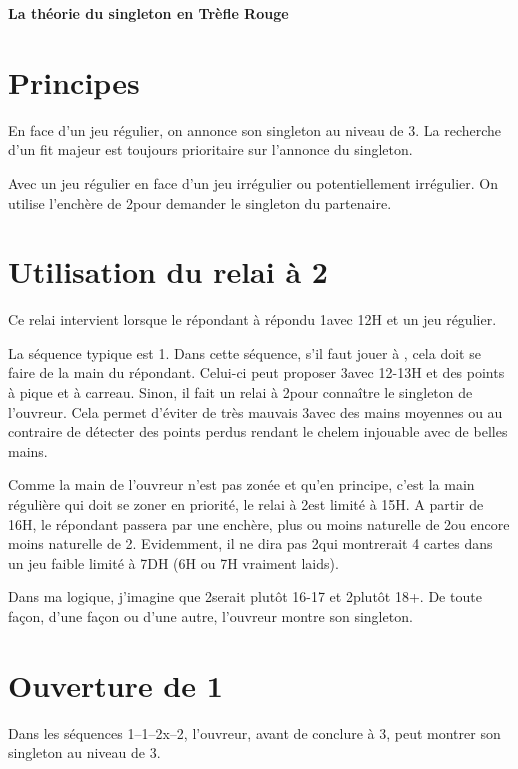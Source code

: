 \documentclass[a4paper,12pt, french]{article}
\newcommand{\T}{\Cl}
\newcommand{\K}{\Di}
\newcommand{\C}{\He}
\renewcommand{\P}{\Sp}
\begin{document}
 
 \begin{center}
 \LARGE{\bf La théorie du singleton en Trèfle Rouge}\\
 \end{center}
 
\section{Principes}

En face d'un jeu régulier, on annonce son singleton au niveau de 3. La recherche d'un fit majeur est toujours prioritaire sur l'annonce du singleton.

Avec un jeu régulier en face d'un jeu irrégulier ou potentiellement irrégulier. On utilise l'enchère de 2\NT pour demander le singleton du partenaire.

\section{Utilisation du relai à 2\NT}

Ce relai intervient lorsque le répondant à répondu 1\P avec 12H et un jeu régulier. 

La séquence typique est 1\T-1\P-2\T. Dans cette séquence, s'il faut jouer à \NT, cela doit se faire de la main du répondant. Celui-ci peut proposer 3\NT avec 12-13H et des points à pique et à carreau. Sinon, il fait un relai à 2\NT pour connaître le singleton de l'ouvreur. Cela permet d'éviter de très mauvais 3\NT avec des mains moyennes ou au contraire de détecter des points perdus rendant le chelem injouable avec de belles mains.

Comme la main de l'ouvreur n'est pas zonée et qu'en principe, c'est la main régulière qui doit se zoner en priorité, le relai à 2\NT est limité à 15H. 
A partir de 16H, le répondant passera par une enchère, plus ou moins naturelle de 2\K ou encore moins naturelle de 2\P. Evidemment, il ne dira pas 2\C qui montrerait 4 cartes dans un jeu faible limité à 7DH (6H ou 7H vraiment laids). 

Dans ma logique, j'imagine que 2\K serait plutôt 16-17 et 2\P plutôt 18+. De toute façon, d'une façon ou d'une autre, l'ouvreur montre son singleton.

\section{Ouverture de 1\P}

Dans les séquences 1\P--1\NT--2x--2\NT, l'ouvreur, avant de conclure à 3\NT, peut montrer son singleton au niveau de 3.
\end{document}
